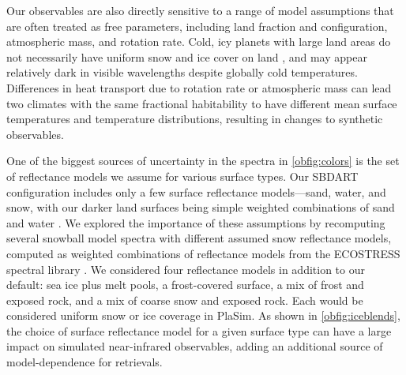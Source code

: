 \documentclass[fleqn,usenatbib]{mnras}
\begin{document}
Our observables are also directly sensitive to a range of model assumptions that are often treated as free parameters, including land fraction and configuration, atmospheric mass, and rotation rate. Cold, icy planets with large land areas do not necessarily have uniform snow and ice cover on land \citep{Paradise2019}, and may appear relatively dark in visible wavelengths despite globally cold temperatures. Differences in heat transport due to rotation rate \citep{Showman2014} or atmospheric mass \citep{Vladilo2013} can lead two climates with the same fractional habitability to have different mean surface temperatures and temperature distributions, resulting in changes to synthetic observables.

One of the biggest sources of uncertainty in the spectra in \autoref{obfig:colors} is the set of reflectance models we assume for various surface types. Our SBDART configuration includes only a few surface reflectance models---sand, water, and snow, with our darker land surfaces being simple weighted combinations of sand and water \citep{disort,Ricchiazzi1998,modtran}. We explored the importance of these assumptions by recomputing several snowball model spectra with different assumed snow reflectance models, computed as weighted combinations of reflectance models from the ECOSTRESS spectral library \citep{aster,ecostress}. We considered four reflectance models in addition to our default: sea ice plus melt pools, a frost-covered surface, a mix of frost and exposed rock, and a mix of coarse snow and exposed rock. Each would be considered uniform snow or ice coverage in PlaSim. As shown in \autoref{obfig:iceblends}, the choice of surface reflectance model for a given surface type can have a large impact on simulated near-infrared observables, adding an additional source of model-dependence for retrievals.  

\end{document}
